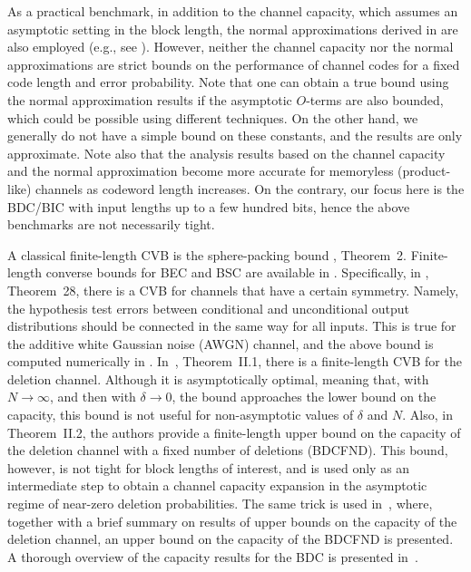 \documentclass[journal, twocol]{IEEEtran}
\begin{document}
As a practical benchmark, in addition to the channel capacity, which assumes an asymptotic setting in the block length, the normal approximations derived in \cite{polyanskiy2010channel} are also employed (e.g., see \cite{piano2020approaching}). However, neither the channel capacity nor the normal approximations are strict bounds on the performance of channel codes for a fixed code length and error probability. Note that one can obtain a true bound using the normal approximation results if the asymptotic $O$-terms are also bounded, which could be possible using different techniques. On the other hand, we generally do not have a simple bound on these constants, and the results are only approximate. Note also that the analysis results based on the channel capacity and the normal approximation become more accurate for memoryless (product-like) channels as codeword length increases. 
On the contrary, our focus here is the BDC/BIC with input lengths up to a few hundred bits, hence the above benchmarks are not necessarily tight.

A classical finite-length CVB is the sphere-packing bound \cite{shannon93lower}, Theorem~2.
Finite-length converse bounds for BEC and BSC are available in \cite{polyanskiy2010channel}. Specifically, in \cite{polyanskiy2010channel}, Theorem~28, there is a CVB for channels that have a certain symmetry. 
Namely, the hypothesis test errors between conditional and unconditional output distributions should be connected in the same way for all inputs. 
This is true for the additive white Gaussian noise (AWGN) channel, and the above bound is computed numerically in \cite{erseghe15evaluation}.
In~\cite{kalai10tight}, Theorem~II.1, there is a finite-length CVB for the deletion channel.
Although it is asymptotically optimal, meaning that, with $N\to\infty$, and then with $\delta\to 0$, the bound approaches the lower bound on the capacity, this bound is not useful for non-asymptotic values of $\delta$ and $N$. Also, in Theorem~II.2, the authors provide a finite-length upper bound on the capacity of the deletion channel with a fixed number of deletions (BDCFND). This bound, however, is not tight for block lengths of interest, and is used only as an intermediate step to obtain a channel capacity expansion in the asymptotic regime of near-zero deletion probabilities. 
The same trick is used in~\cite{li14capacity}, where, together with a brief summary on results of upper bounds on the capacity of the deletion channel, an upper bound on the capacity of the BDCFND is presented. 
A thorough overview of the capacity results for the BDC is presented in~\cite{cheraghchi21overview}.
\end{document}
